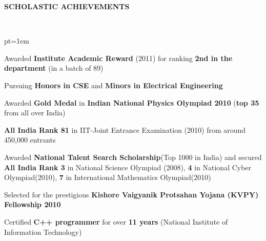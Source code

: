 \documentclass[a4paper,10pt]{report}
\newcommand{\csep}{-3 pt}
\newcommand{\lsep}{-0.4cm}
\newcommand{\psep}{-0.4cm}
\newcommand{\tsep}{5pt}
\newcommand{\resheading}[1]{{\hspace{-0.7cm}  \normalsize \colorbox{mygrey}{\begin{minipage}{\textwidth}{ {\textbf{#1}  \vphantom{p\^{E}}}}\end{minipage}}}}
\begin{document}
\resheading{SCHOLASTIC ACHIEVEMENTS}\\[\lsep]
\begin{list}{}{\itemsep=\csep \leftmargin=1em \topsep=\tsep}
		\item Awarded \textbf{Institute Academic Reward} (2011) for ranking \textbf{2nd in the department} (in a batch of 89)
		\item Pursuing \textbf{Honors in CSE} and \textbf{Minors in Electrical Engineering} 
		\item Awarded \textbf{Gold Medal} in \textbf{Indian National Physics Olympiad 2010} (\textbf{top 35} from all over India)
		\item \textbf{All India Rank 81} in IIT-Joint Entrance Examination (2010) from around 450,000 entrants 				
		\item Awarded \textbf{National Talent Search Scholarship}(Top 1000 in India)
		and secured \textbf{All India Rank 3} in National Science Olympiad (2008), \textbf{4} in National Cyber Olympiad(2010), \textbf{7} in International Mathematics Olympiad(2010)
				
		\item Selected for the prestigious \textbf{Kishore Vaigyanik Protsahan Yojana (KVPY) Fellowship 2010} 
		\item Certified \textbf{C++ programmer} for over \textbf{11 years} (National Institute of Information Technology)\\[\lsep]
\end{list}

\end{document}
